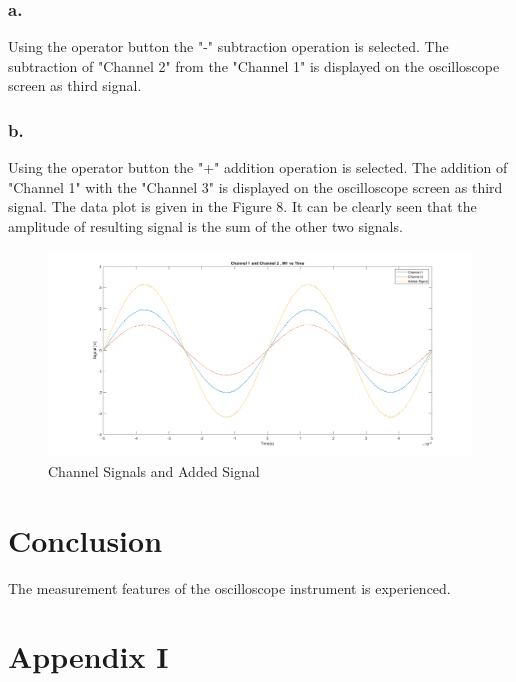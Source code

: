 \documentclass[letterpaper,12pt]{article}
\begin{document}
\subsubsection{a.}
 Using the operator button the "-" subtraction operation is selected. The subtraction of "Channel 2" from the "Channel 1" is displayed on the oscilloscope screen as third signal. 
\subsubsection{b.}
Using the operator button the "+" addition operation is selected. The addition of "Channel 1" with the "Channel 3" is displayed on the oscilloscope screen as third signal. The data plot is given in the Figure 8. It can be clearly seen that the amplitude of resulting signal is the sum of the other two signals. 
\begin{figure}[!ht]
	\caption{ Channel Signals and Added Signal  }
	\centering
	\includegraphics[width=1\textwidth]{9b.png}
\end{figure}


\section{Conclusion}
The measurement features of the oscilloscope instrument is experienced.
\section{Appendix I}




\end{document}
